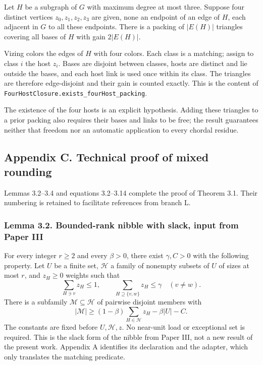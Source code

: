 \documentclass[english,11pt,a4paper]{article}
\newcounter{none}
\begin{document}
Let \(H\) be a subgraph of \(G\) with maximum degree at most three. Suppose four distinct vertices \(z_0,z_1,z_2,z_3\) are given, none an endpoint of an edge of \(H\), each adjacent in \(G\) to all these endpoints. There is a packing of \(|E(H)|\) triangles covering all bases of \(H\) with gain \(2|E(H)|\).

Vizing colors the edges of \(H\) with four colors. Each class is a matching; assign to class \(i\) the host \(z_i\). Bases are disjoint between classes, hosts are distinct and lie outside the bases, and each host link is used once within its class. The triangles are therefore edge-disjoint and their gain is counted exactly. This is the content of \nolinkurl{FourHostClosure.exists_fourHost_packing}.

The existence of the four hosts is an explicit hypothesis. Adding these triangles to a prior packing also requires their bases and links to be free; the result guarantees neither that freedom nor an automatic application to every chordal residue.

\subsection{Appendix C. Technical proof of mixed rounding}\label{appendix-c.-technical-proof-of-mixed-rounding}

Lemmas 3.2--3.4 and equations 3.2--3.14 complete the proof of Theorem 3.1. Their numbering is retained to facilitate references from branch L.

\subsubsection{Lemma 3.2. Bounded-rank nibble with slack, input from Paper III}\label{lemma-3.2.-bounded-rank-nibble-with-slack-input-from-paper-iii}

For every integer \(r\ge2\) and every \(\beta>0\), there exist \(\gamma,C>0\) with the following property. Let \(U\) be a finite set, \(\mathcal H\) a family of nonempty subsets of \(U\) of sizes at most \(r\), and \(z_H\ge0\) weights such that \[
\sum_{H\ni v}z_H\le1,\qquad
\sum_{H\supseteq\{v,w\}}z_H\le\gamma\quad(v\ne w).
\tag{3.2}
\] There is a subfamily \(\mathcal M\subseteq\mathcal H\) of pairwise disjoint members with \[
|\mathcal M|\ge(1-\beta)\sum_{H\in\mathcal H}z_H-\beta|U|-C.
\tag{3.3}
\] The constants are fixed before \(U,\mathcal H,z\). No near-unit load or exceptional set is required. This is the slack form of the nibble from Paper III, not a new result of the present work. Appendix A identifies its declaration and the adapter, which only translates the matching predicate.
\end{document}
